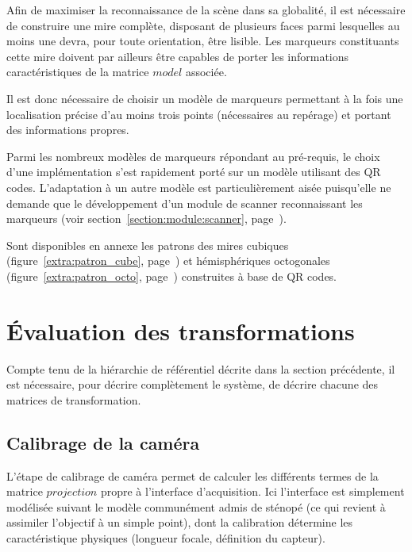 \documentclass[10pt,a4paper,twoside, twocolumn]{report}
\begin{document}
Afin de maximiser la reconnaissance de la scène dans sa globalité, il est nécessaire de construire une mire complète, disposant de plusieurs faces parmi lesquelles au moins une devra, pour toute orientation, être lisible. Les marqueurs constituants cette mire doivent par ailleurs être capables de porter les informations caractéristiques de la matrice $model$ associée.

Il est donc nécessaire de choisir un modèle de marqueurs permettant à la fois une localisation précise d’au moins trois points (nécessaires au repérage) et portant des informations propres.

Parmi les nombreux modèles de marqueurs répondant au pré-requis, le choix d’une implémentation s’est rapidement porté sur un modèle utilisant des QR codes. L’adaptation à un autre modèle est particulièrement aisée puisqu’elle ne demande que le développement d’un module de scanner reconnaissant les marqueurs (voir section~\ref{section:module:scanner}, page~\pageref{section:module:scanner}).

Sont disponibles en annexe les patrons des mires cubiques (figure~\ref{extra:patron_cube}, page~\pageref{extra:patron_cube}) et hémisphériques octogonales (figure~\ref{extra:patron_octo}, page~\pageref{extra:patron_octo}) construites à base de QR codes.



\section{Évaluation des transformations}

Compte tenu de la hiérarchie de référentiel décrite dans la section précédente, il est nécessaire, pour décrire complètement le système, de décrire chacune des matrices de transformation. 


\subsection{Calibrage de la caméra}

L’étape de calibrage de caméra permet de calculer les différents termes de la matrice $projection$ propre à l’interface d’acquisition. Ici l’interface est simplement modélisée suivant le modèle communément admis de sténopé (ce qui revient à assimiler l’objectif à un simple point), dont la calibration détermine les caractéristique physiques (longueur focale, définition du capteur).
\end{document}
